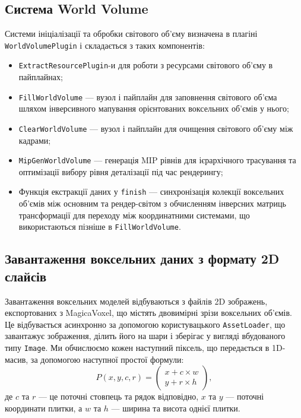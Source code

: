 \subsection{Система World Volume}

Системи ініціалізації та обробки світового об'єму визначена в плагіні \texttt{World\-VolumePlugin} і складається з таких компонентів:

\begin{itemize}[itemsep=0pt, topsep=0pt, label=$\diamond$]
    \item \texttt{ExtractResourcePlugin}-и для роботи з ресурсами світового об'єму в пайплайнах;
    \item \texttt{FillWorldVolume} --- вузол і пайплайн для заповнення світового об'єма шляхом інверсивного мапування орієнтованих воксельних об'ємів у нього;
    \item \texttt{ClearWorldVolume} --- вузол і пайплайн для очищення світового об'єму між кадрами;
    \item \texttt{MipGenWorldVolume} --- генерація MIP рівнів для ієрархічного трасування та оптимізації вибору рівня деталізації під час рендерингу;
    \item Функція екстракції даних у \texttt{finish} --- синхронізація колекції воксельних об'ємів між основним та рендер-світом з обчисленням інверсних матриць трансформації для переходу між координатними системами, що використаються пізніше в \texttt{FillWorldVolume}.
\end{itemize}

\subsection{Завантаження воксельних даних з формату 2D\\слайсів}

Завантаження воксельних моделей відбуваються з файлів 2D зображень, експортованих з MagicaVoxel, що містять двовимірні зрізи воксельних об'ємів. Це відбувається асинхронно за допомогою користувацького \texttt{AssetLoader}, що завантажує зображення, ділить його на шари і зберігає у вигляді вбудованого типу \texttt{Image}. Ми обчислюємо кожен наступний піксель, що передається в 1D-масив, за допомогою наступної простої формули:
\begin{equation*}
    P(x,y,c,r) = \begin{pmatrix}
        x + c \times w \\
        y + r \times h
    \end{pmatrix},
\end{equation*}
де $c$ та $r$ --- це поточні стовпець та рядок відповідно, $x$ та $y$ --- поточні координати плитки, а $w$ та $h$ --- ширина та висота однієї плитки.\cite{3dTexture}

